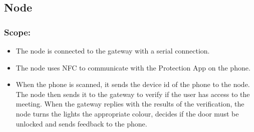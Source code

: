 \begin{comment}
Template vir elke funksie
    \paragraph{Funksie naam}
			\begin{description}
			    \item{\textbf{Priority}:} %
			    \item{\textbf{Service Contract}:}%
			    \item{\textbf{Pre-conditions}:}%
    			    \begin{itemize}
    			        \item %
    			        \item %
    			    \end{itemize}
			    \item{\textbf{Post-conditions}:} %
    			    \begin{itemize}
    			    \item %
    			    \item %
    			    \end{itemize}
			\end{description}
\end{comment}






\subsection{Node}
    \subsubsection{Scope:} 
    \begin{itemize}
    \item The node is connected to the gateway with a serial connection.
    \item The node uses NFC to communicate with the Protection App on the phone.
    \item When the phone is scanned, it sends the device id of the phone to the node. The node then sends it to the gateway to verify if the user has access to the meeting. When the gateway replies with the results of the verification, the node turns the lights the appropriate colour, decides if the door must be unlocked and sends feedback to the phone.
    
    \end{itemize} 
    
